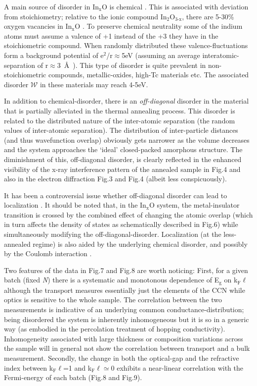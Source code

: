\documentclass
[preprint,showpacs,byrevtex,10pt,twocolumn,tightenlines,prl,letterpaper]{revtex4}%
\begin{document}
A main source of disorder in In$_{\text{x}}$O is chemical \cite{24,46}. This
is associated with deviation from stoichiometry; relative to the ionic
compound In$_{\text{2}}$O$_{\text{3-x}}$, there are 5-30\% oxygen vacancies in
In$_{\text{x}}$O \cite{24}. To preserve chemical neutrality some of the indium
atoms must assume a valence of +1 instead of the +3 they have in the
stoichiometric compound. When randomly distributed these valence-fluctuations
form a background potential of e$^{\text{2}}$/r$\approx$5eV (assuming an
average interatomic-separation of r$\approx$3~\AA \ \cite{55}). This type of
disorder is quite prevalent in non-stoichiometric compounds, metallic-oxides,
high-Tc materials etc. The associated disorder $\mathcal{W}$ in these
materials may reach 4-5eV.

In addition to chemical-disorder, there is an \textit{off-diagonal} disorder
in the material that is partially alleviated in the thermal annealing process.
This disorder is related to the distributed nature of the inter-atomic
separation (the random values of inter-atomic separation). The distribution of
inter-particle distances (and thus wavefunction overlap) obviously gets
narrower as the volume decreases and the system approaches the `ideal'
closed-packed amorphous structure. The diminishment of this, off-diagonal
disorder, is clearly reflected in the enhanced visibility of the x-ray
interference pattern of the annealed sample in Fig.4 and also in the electron
diffraction Fig.3 and Fig.4 (albeit less conspicuously).

It has been a controversial issue whether off-diagonal disorder can lead to
localization \cite{56,57,58}. It should be noted that, in the In$_{\text{x}}$O
system, the metal-insulator transition is crossed by the combined effect of
changing the atomic overlap (which in turn affects the density of states as
schematically described in Fig.6) while simultaneously modifying the
off-diagonal-disorder. Localization (at the less-annealed regime) is also
aided by the underlying chemical disorder, and possibly by the Coulomb
interaction \cite{59}.

Two features of the data in Fig.7 and Fig.8 are worth noticing: First, for a
given batch (fixed \textit{N}) there is a systematic and monotonous dependence
of E$_{\text{g}}$ on k$_{\text{F}}\ell$ although the transport measures
essentially just the elements of the CCN while optics is sensitive to the
whole sample. The correlation between the two measurements is indicative of an
underlying common conductance-distribution; being disordered the system is
inherently inhomogeneous but it is so in a generic way (as embodied in the
percolation treatment of hopping conductivity). Inhomogeneity associated with
large thickness or composition variations across the sample will in general
not show the correlation between transport and a bulk measurement. Secondly,
the change in both the optical-gap and the refractive index between
k$_{\text{F}}\ell$=1 and k$_{\text{F}}\ell\simeq$0 exhibits a near-linear
correlation with the Fermi-energy of each batch (Fig.8 and Fig.9).
\end{document}

